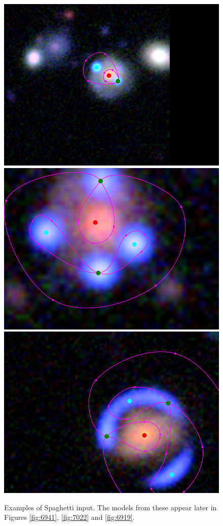\begin{figure}
\includegraphics[height=.3\vsize]{fig/spag6941.png} \\
\includegraphics[height=.3\vsize]{fig/spag7022.png} \\
\includegraphics[height=.3\vsize]{fig/spag6919.png}
\caption{Examples of Spaghetti input.  The models from these appear
  later in Figures \ref{fig:6941}, \ref{fig:7022} and
  \ref{fig:6919}. \label{fig:input-spag}}
\end{figure}


